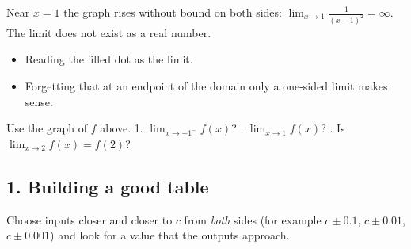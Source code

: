 \begin{example}
\begin{center}
\end{center}
\sol Near $x=1$ the graph rises without bound on both sides: $\lim_{x\to1}\frac{1}{(x-1)^2}=\infty$. The limit does not exist as a real number.
\end{example}

\begin{mistakes}
\begin{itemize}
\item Reading the filled dot as the limit.
\item Forgetting that at an endpoint of the domain only a one-sided limit makes sense.
\end{itemize}
\end{mistakes}

\begin{quickcheck}
Use the graph of $f$ above. 1. $\lim_{x\to-1^-}f(x)$? . $\lim_{x\to1}f(x)$? . Is $\lim_{x\to2}f(x)=f(2)$?
\end{quickcheck}


\subsection*{1. Building a good table}
Choose inputs closer and closer to $c$ from \emph{both} sides (for example $c\pm0.1$, $c\pm0.01$, $c\pm0.001$) and look for a value that the outputs approach.

